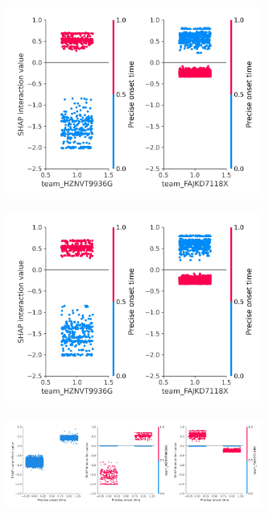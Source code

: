 \newpage

\iffalse

    \begin{figure}[!h]
    \centering
    \includegraphics[width=0.75\textwidth]{./images/12aa_onset_time_type_interaction_example}
    \caption{}
    \label{fig:results_1}
    \end{figure}
    
    \newpage
    
    \begin{figure}[!h]
    \centering
    \includegraphics[width=0.75\textwidth]{./images/12aa_xgb_10_features_Precise onset time_interaction_example}
    \caption{}
    \label{fig:results_3}
    \end{figure}
    
    \newpage
    
    \begin{figure}[!h]
    \centering
    \includegraphics[width=0.75\textwidth]{./images/12aa_xgb_10_features_Precise onset time_interaction_example_with_main_effect}
    \caption{}
    \label{fig:results_4}
    \end{figure}
    

